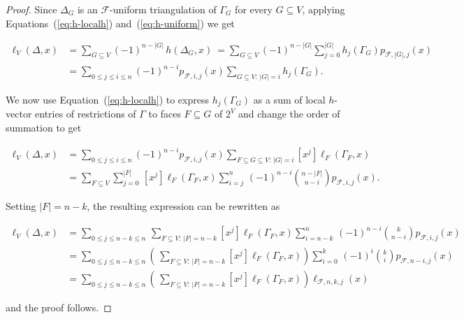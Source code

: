 \documentclass[11pt]{amsart}
\newcommand{\fF}{{\mathcal F}}
\begin{document}
\begin{proof}
Since $\Delta_G$ is an $\fF$-uniform triangulation
of $\Gamma_G$ for every $G \subseteq V$, applying 
Equations~(\ref{eq:h-localh}) 
and~(\ref{eq:h-uniform}) we get 

\begin{align*}
\ell_V(\Delta,x) & = \sum_{G \subseteq V} 
     (-1)^{n - |G|} \, h (\Delta_G, x) \ = 
		 \sum_{G \subseteq V} (-1)^{n - |G|} 
     \sum_{j=0}^{|G|} h_j(\Gamma_G) p_{\fF,|G|,j}(x) 
		\\ & = \sum_{0 \le j \le i \le n} (-1)^{n-i} 
		       p_{\fF,i,j}(x)
    \sum_{G \subseteq V: \, |G|=i} h_j(\Gamma_G).  
\end{align*}

\medskip
\noindent
We now use Equation~(\ref{eq:h-localh}) to express 
$h_j(\Gamma_G)$ as a sum of local $h$-vector entries 
of restrictions of $\Gamma$ to faces $F \subseteq G$
of $2^V$ and change the order of summation to get 

\begin{align*}
\ell_V(\Delta,x) & = 
\sum_{0 \le j \le i \le n} (-1)^{n-i} p_{\fF,i,j}(x)
\sum_{F \subseteq G \subseteq V: \, |G|=i} [x^j] 
      \ell_F(\Gamma_F,x) \\
			& = \sum_{F \subseteq V} \sum_{j=0}^{|F|} \,
			[x^j] \ell_F(\Gamma_F,x) 
			\sum_{i=j}^n \, (-1)^{n-i} 
			{n-|F| \choose n-i} p_{\fF,i,j}(x).
\end{align*}

\medskip
\noindent
Setting $|F| = n-k$, the resulting expression can be
rewritten as 

\begin{align*}
\ell_V(\Delta,x) & = 
\sum_{0 \le j \le n-k \le n} \,
\sum_{F \subseteq V: \, |F|=n-k} [x^j] 
                                 \ell_F(\Gamma_F,x) 
			\sum_{i=n-k}^n \, (-1)^{n-i} 
			{k \choose n-i} p_{\fF,i,j}(x) \\ & = 
\sum_{0 \le j \le n-k \le n} \left( \,
\sum_{F \subseteq V: \, |F|=n-k} [x^j] 
                     \ell_F(\Gamma_F,x) \right) 
			\sum_{i=0}^k \, (-1)^i {k \choose i} 
			p_{\fF,n-i,j}(x) \\ & = 
			\sum_{0 \le j \le n-k \le n} \left( \,
\sum_{F \subseteq V: \, |F|=n-k} [x^j] 
        \ell_F(\Gamma_F,x) \right) 
				\ell_{\fF,n,k,j}(x)
\end{align*}

\medskip
\noindent
and the proof follows.
\end{proof}
\end{document}

